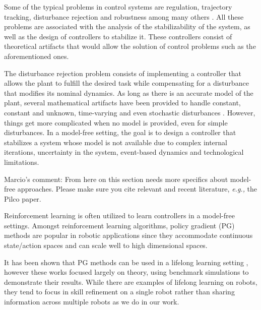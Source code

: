 \documentclass{aamas2016}
\begin{document}
Some of the typical problems in control systems are regulation, trajectory tracking, disturbance rejection and
robustness among many others \cite{Khalil-2002, Lewis-2012,Nise-2010}. All these problems are associated with the analysis of the stabilizability of the system, 
as well as the design of controllers to stabilize it. These controllers consist of theoretical artifacts that would allow 
the solution of control problems such as the aforementioned ones.

The disturbance rejection problem consists of implementing a controller that allows the plant to fulfill the desired task while compensating
for a disturbance that modifies its nominal dynamics. As long as there is an accurate model of the plant, several mathematical
artifacts have been provided to handle constant, constant and unknown, time-varying and even stochastic disturbances 
\cite{Dorato-2000,Khalil-2002,Lewis-2012}. 
However, things get more complicated when no model is provided, even for simple disturbances. In a model-free setting, the goal is to design a 
controller that stabilizes a system whose model is not available due to complex internal iterations, uncertainty in the system, event-based
dynamics and technological limitations.

{\color{red} Marcio's comment: From here on this section needs more specifics about model-free approaches. Please make sure you cite 
relevant and recent literature, \emph{e.g.,} the Pilco paper.}

Reinforcement learning \cite{kober2013reinforcement} is often utilized to learn controllers in a model-free settings. Amongst reinforcement learning algorithms, policy gradient (PG) methods \cite{sutton1999policy} are popular in robotic applications since they accommodate continuous state/action spaces and can scale well to high dimensional spaces. 


It has been shown that PG methods can be used in a lifelong learning setting \cite{BouAmmar2014a,bouAmmar2015unsupervised}, however these works focused largely on theory, using benchmark simulations to demonstrate their results. While there are examples of lifelong learning on robots, they tend to focus in skill refinement on a single robot \cite{kleiner2002towards,thrun1995lifelong} rather than sharing information across multiple robots as we do in our work. 
\end{document}

